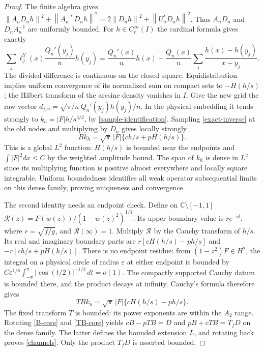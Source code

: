 \documentclass[a4paper,11pt]{amsart}
\theoremstyle{remark}\newtheorem{remark}[theorem]{Remark}
\newcommand{\dd}{\,d}
\newcommand{\norm}[1]{\left\lVert#1\right\rVert}
\begin{document}
\begin{proof}
The finite algebra gives
$\norm{A_nD_nh}^2+\norm{A_n^{-*}D_nh}^2
 =2\norm{D_nh}^2+\norm{U_n^*D_nh}^2$.
Thus $A_nD_n$ and $D_nA_n^{-1}$ are uniformly bounded.
For $h\in C_c^\infty(I)$ the cardinal formula gives exactly
\begin{equation}\label{exact-inverse}
 \sum_j\ell_j^Y(x)\frac{Q_n'(y_j)}n h(y_j)
 =\frac{Q_n'(x)}n h(x)
 -\frac{Q_n(x)}n\sum_j\frac{h(x)-h(y_j)}{x-y_j}.
\end{equation}
The divided difference is continuous on the closed square.
Equidistribution implies uniform convergence of its normalized sum
on compact sets to $-H(h/s)$; the Hilbert transform of the arcsine
density vanishes in $I$.
Give the new grid the raw vector
$d_{j,n}=\sqrt{\pi/n}\,Q_n'(y_j)h(y_j)/n$.
In the physical embedding it tends strongly to
$k_h=|F|h/s^{3/2}$, by \eqref{sample-identification}.
Sampling \eqref{exact-inverse} at the old nodes and multiplying by
$D_n$ gives locally strongly
\begin{equation}\label{B-core}
 Bk_h=\sqrt\pi\,|F|\{ch/s+pH(h/s)\}.
\end{equation}
This is a global $L^2$ function: $H(h/s)$ is bounded near the
endpoints and $\int|F|^2dx\le C$ by the weighted amplitude bound.
The span of $k_h$ is dense in $L^2$ since its multiplying function
is positive almost everywhere and locally square integrable.
Uniform boundedness identifies all weak operator subsequential
limits on this dense family, proving uniqueness and convergence.

The second identity needs an endpoint check. Define on
$\mathbb C\setminus[-1,1]$
$\mathcal R(z)=F(w(z))/(1-w(z)^2)^{1/4}$.
Its upper boundary value is $r e^{-i\delta}$, where
$r=\sqrt{f/g}$, and $\mathcal R(\infty)=1$.
Multiply $\mathcal R$ by the Cauchy transform of $h/s$.
Its real and imaginary boundary parts are
$r[cH(h/s)-ph/s]$ and $-r[ch/s+pH(h/s)]$.
There is no endpoint residue: from $(1-z^2)F\in H^2$, the integral
on a physical circle of radius $\varepsilon$ at either endpoint is
bounded by $C\varepsilon^{1/8}\int_{-\pi}^{\pi}
 |\cos(t/2)|^{-1/2}\dd t=o(1)$.
The compactly supported Cauchy datum is bounded there, and the
product decays at infinity. Cauchy's formula therefore gives
\begin{equation}\label{TB-core}
 TBk_h=\sqrt\pi\,|F|\{cH(h/s)-ph/s\}.
\end{equation}
The fixed transform $T$ is bounded: its power exponents are within
the $A_2$ range. Rotating \eqref{B-core} and \eqref{TB-core} yields
$cB-pTB=D$ and $pB+cTB=T_fD$ on the dense family. The latter
defines the bounded extension $L$, and rotating back proves
\eqref{channels}. Only the product $T_fD$ is asserted bounded.
\end{proof}
\end{document}
